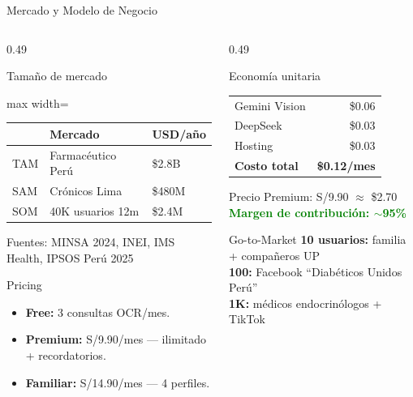 \documentclass[aspectratio=169,11pt]{beamer}
\newcommand{\tightlist}{\setlength\itemsep{2pt}\setlength\parskip{0pt}\setlength\parsep{0pt}}
\begin{document}
\begin{frame}[t]{Mercado y Modelo de Negocio}
\vspace{-0.3em}
\begin{columns}[T,onlytextwidth]
\begin{column}{0.49\textwidth}
\begin{block}{Tamaño de mercado}
\begin{adjustbox}{max width=\linewidth}
\begin{tabular}{lll}
\toprule
& \textbf{Mercado} & \textbf{USD/año} \\
\midrule
TAM & Farmacéutico Perú & \$2.8B \\
SAM & Crónicos Lima & \$480M \\
SOM & 40K usuarios 12m & \$2.4M \\
\bottomrule
\end{tabular}
\end{adjustbox}
\vspace{0.15em}
{\tiny Fuentes: MINSA 2024, INEI, IMS Health, IPSOS Perú 2025}
\end{block}
\vspace{0.25em}
\begin{block}{Pricing}
\begin{itemize}\tightlist
  \item \textbf{Free:} 3 consultas OCR/mes.
  \item \textbf{Premium:} S/9.90/mes — ilimitado + recordatorios.
  \item \textbf{Familiar:} S/14.90/mes — 4 perfiles.
\end{itemize}
\end{block}
\end{column}
\begin{column}{0.49\textwidth}
\begin{block}{Economía unitaria}
\begin{tabularx}{\linewidth}{@{}Xr@{}}
Gemini Vision & \$0.06 \\
DeepSeek & \$0.03 \\
Hosting & \$0.03 \\
\midrule
\textbf{Costo total} & \textbf{\$0.12/mes} \\
\end{tabularx}
\vspace{0.25em}
Precio Premium: S/9.90 $\approx$ \$2.70\\
\textcolor{Green}{\textbf{Margen de contribución: \(\sim\)95\%}}
\end{block}
\vspace{0.25em}
\begin{block}{Go-to-Market}
\textbf{10 usuarios:} familia + compañeros UP\\
\textbf{100:} Facebook ``Diabéticos Unidos Perú''\\
\textbf{1K:} médicos endocrinólogos + TikTok
\end{block}
\end{column}
\end{columns}
\end{frame}
\end{document}
